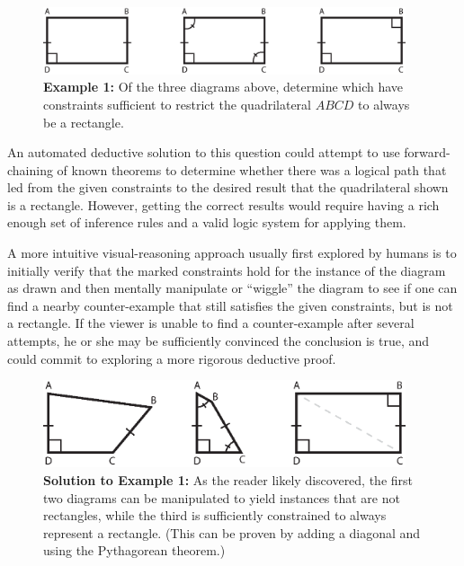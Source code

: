 \begin{figure}[h!]
\label{example-1}
\centering
\includegraphics[width=0.95\textwidth]{diagrams/rectangles.eps}
\captionsetup{labelformat=empty}
\caption{{\bf Example 1:} Of the three diagrams above, determine which
  have constraints sufficient to restrict the quadrilateral $ABCD$ to
  always be a rectangle.}
\end{figure}

An automated deductive solution to this question could attempt to use
forward-chaining of known theorems to determine whether there was a
logical path that led from the given constraints to the desired result
that the quadrilateral shown is a rectangle.  However, getting the
correct results would require having a rich enough set of inference
rules and a valid logic system for applying them.

A more intuitive visual-reasoning approach usually first explored by
humans is to initially verify that the marked constraints hold for the
instance of the diagram as drawn and then mentally manipulate or
``wiggle'' the diagram to see if one can find a nearby counter-example
that still satisfies the given constraints, but is not a rectangle.
If the viewer is unable to find a counter-example after several
attempts, he or she may be sufficiently convinced the conclusion is
true, and could commit to exploring a more rigorous deductive proof.

\newpage
\begin{figure}[h!]
\centering
\includegraphics[width=0.95\textwidth]{diagrams/rectangles-answer.eps}
\captionsetup{labelformat=empty}
\caption{{\bf Solution to Example 1:} As the reader likely discovered,
  the first two diagrams can be manipulated to yield instances that
  are not rectangles, while the third is sufficiently constrained to
  always represent a rectangle.  (This can be proven by adding a
  diagonal and using the Pythagorean theorem.)}
\end{figure}

